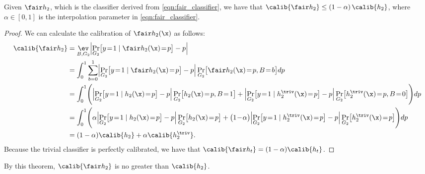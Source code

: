 %
\begin{lemma}
  Given $\fair h_2$, which is the classifier derived from \eqref{eqn:fair_classifier},
  we have that $\calib{\fair h_2} \leq \left( 1 - \alpha \right) \calib{h_2}$, where
  $\alpha \in [0, 1]$ is the interpolation parameter in \eqref{eqn:fair_classifier}.
  \label{thm:calibration}
\end{lemma}
%
\begin{proof}
  We can calculate the calibration of $\fair h_2(\x)$ as follows:
  \begin{align*}
    \calib{\fair h_2}
    &= \mathop{\ev}_{B, G_2} \Bigl\lvert \Pr_{G_2} \bigl[ y\!=\!1 \mid \fair
    h_2(\x)\!=\!p \bigr] - p \Bigr\rvert
    \\
    &= \int_{0}^1 \sum_{b=0}^1 \Bigl\lvert \Pr_{G_2} \bigl[ y\!=\!1 \mid \fair
    h_2(\x) \!=\!p \bigr] - p \Bigr\rvert
    \Pr_{G_2} \bigl[ \fair h_2(\x)\!=\!p, B\!=\!b \bigr] dp
    \\
    &= \int_{0}^1 \Biggl( \Bigl\lvert \Pr_{G_2} \bigl[ y\!=\!1 \mid h_2(\x)
    \!=\!p \bigr] - p \Bigr\rvert \Pr_{G_2} \bigl[ h_2(\x)\!=\!p, B\!=\!1 \bigr]
    + \Bigl\lvert \Pr_{G_2} \bigl[ y\!=\!1 \mid h^\triv_2(\x) \!=\!p
    \bigr] - p \Bigr\rvert \Pr_{G_2} \bigl[ h^\triv_2(\x)\!=\!p, B\!=\!0 \bigr] \Biggr) dp
    \\
    &= \int_{0}^1 \Biggl( \alpha \Bigl\lvert \Pr_{G_2} \bigl[ y\!=\!1 \mid
    h_2(\x) \!=\!p \bigr] - p \Bigr\rvert \Pr_{G_2} \bigl[ h_2(\x)\!=\!p \bigr]
    +  \bigl( 1 \! - \! \alpha \bigr) \Bigl\lvert \Pr_{G_2}
    \bigl[ y\!=\!1 \mid h^\triv_2(\x) \!=\!p \bigr] - p \Bigr\rvert \Pr_{G_2}
    \bigl[ h^\triv_2(\x)\!=\!p \bigr] \Biggr) dp
    \\
    &= (1-\alpha) \calib{h_2} + \alpha \calib{h^\triv_2}.
  \end{align*}
  Because the trivial classifier is perfectly calibrated, we have that $\calib{\fair h_t} = (1 - \alpha) \calib{h_t}$.
\end{proof}
%
By this theorem, $\calib{\fair h_2}$ is no greater than $\calib{h_2}$.
